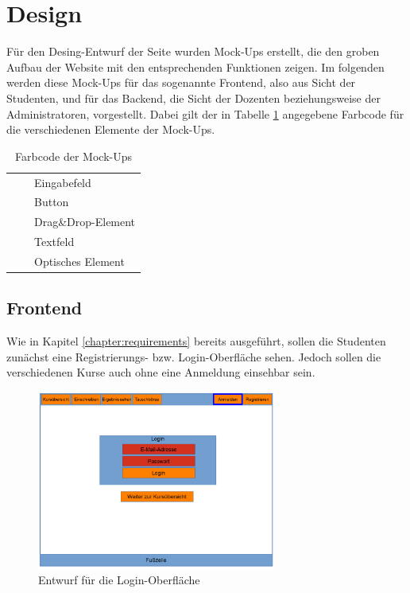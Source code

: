     \section{Design}
        Für den Desing-Entwurf der Seite wurden Mock-Ups erstellt, die den groben Aufbau der Website mit den entsprechenden Funktionen zeigen. 
        Im folgenden werden diese Mock-Ups für das sogenannte Frontend, also aus Sicht der Studenten, und für das Backend, die Sicht der Dozenten beziehungsweise der Administratoren, vorgestellt.
        Dabei gilt der in Tabelle \ref{tab:Farbcode} angegebene Farbcode für die verschiedenen Elemente der Mock-Ups.
        \begin{table}
            \centering
            \begin{tabular}{l c| l}
                \cellcolor{red} & & Eingabefeld\\
                \cellcolor{orange} & & Button\\
                \cellcolor{olive} & & Drag\&Drop-Element\\
                \cellcolor{green} & & Textfeld\\
                \cellcolor{blue} & & Optisches Element
            \end{tabular}
            \caption{Farbcode der Mock-Ups}
            \label{tab:Farbcode}
        \end{table}
    
        \subsection{Frontend}
            Wie in Kapitel \ref{chapter:requirements} bereits ausgeführt, sollen die Studenten zunächst eine Registrierungs- bzw. Login-Oberfläche sehen.
            Jedoch sollen die verschiedenen Kurse auch ohne eine Anmeldung einsehbar sein.
            \begin{figure}[t]
            	\centering
            	\includegraphics[width=0.7\textwidth]{./design/images/MockUpsFrontend/frontendLogin.png}
            	\caption{Entwurf für die Login-Oberfläche}
            	\label{mockupLoginFrontend}
            \end{figure}   
        
